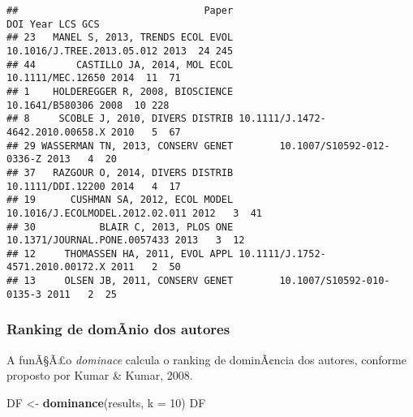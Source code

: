 \documentclass[]{article}
\newenvironment{Shaded}{\begin{snugshade}}{\end{snugshade}}
\newcommand{\KeywordTok}[1]{\textcolor[rgb]{0.13,0.29,0.53}{\textbf{#1}}}
\newcommand{\DataTypeTok}[1]{\textcolor[rgb]{0.13,0.29,0.53}{#1}}
\newcommand{\DecValTok}[1]{\textcolor[rgb]{0.00,0.00,0.81}{#1}}
\newcommand{\StringTok}[1]{\textcolor[rgb]{0.31,0.60,0.02}{#1}}
\newcommand{\OperatorTok}[1]{\textcolor[rgb]{0.81,0.36,0.00}{\textbf{#1}}}
\newcommand{\NormalTok}[1]{#1}
\begin{document}
\begin{Shaded}
\end{Shaded}

\begin{verbatim}
##                                Paper                              DOI Year LCS GCS
## 23   MANEL S, 2013, TRENDS ECOL EVOL       10.1016/J.TREE.2013.05.012 2013  24 245
## 44       CASTILLO JA, 2014, MOL ECOL                10.1111/MEC.12650 2014  11  71
## 1    HOLDEREGGER R, 2008, BIOSCIENCE                  10.1641/B580306 2008  10 228
## 8     SCOBLE J, 2010, DIVERS DISTRIB 10.1111/J.1472-4642.2010.00658.X 2010   5  67
## 29 WASSERMAN TN, 2013, CONSERV GENET        10.1007/S10592-012-0336-Z 2013   4  20
## 37   RAZGOUR O, 2014, DIVERS DISTRIB                10.1111/DDI.12200 2014   4  17
## 19      CUSHMAN SA, 2012, ECOL MODEL  10.1016/J.ECOLMODEL.2012.02.011 2012   3  41
## 30           BLAIR C, 2013, PLOS ONE     10.1371/JOURNAL.PONE.0057433 2013   3  12
## 12     THOMASSEN HA, 2011, EVOL APPL 10.1111/J.1752-4571.2010.00172.X 2011   2  50
## 13     OLSEN JB, 2011, CONSERV GENET        10.1007/S10592-010-0135-3 2011   2  25
\end{verbatim}

\subsubsection{Ranking de domÃ­nio dos
autores}\label{ranking-de-domanio-dos-autores}

A funÃ§Ã£o \emph{dominace} calcula o ranking de dominÃ¢ncia dos autores,
conforme proposto por Kumar \& Kumar, 2008.

\begin{Shaded}
\begin{Highlighting}[]
\NormalTok{DF <-}\StringTok{ }\KeywordTok{dominance}\NormalTok{(results, }\DataTypeTok{k =} \DecValTok{10}\NormalTok{)}
\NormalTok{DF}
\end{Highlighting}
\end{Shaded}
\end{document}
